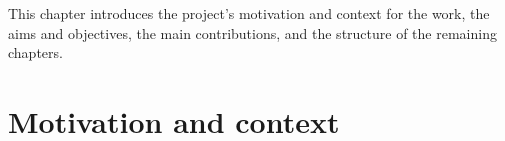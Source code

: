 %

This chapter introduces the project's motivation and context for the work, the aims and objectives, the main contributions, and the structure of the remaining chapters.


\section{Motivation and context}\label{sec:motivation}


